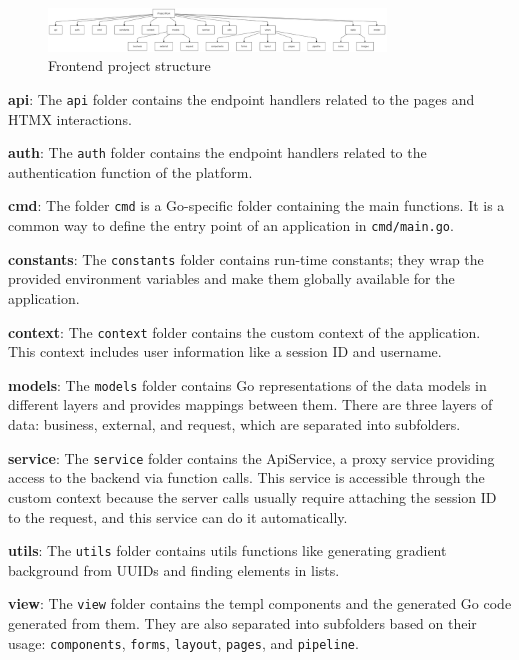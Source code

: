 \begin{figure}[H]
    \centering
    \includegraphics[width=0.8\textwidth, keepaspectratio]{figures/frontend-project-structure.png}
    \caption{Frontend project structure}
    \label{fig:frontend-project-structure}
\end{figure}

\textbf{api}: The \texttt{api} folder contains the endpoint handlers related to the pages and HTMX interactions.

\textbf{auth}: The \texttt{auth} folder contains the endpoint handlers related to the authentication function of the platform.

\textbf{cmd}: The folder \texttt{cmd} is a Go-specific folder containing the main functions. It is a common way to define the entry point of an application in \texttt{cmd/main.go}.

\textbf{constants}: The \texttt{constants} folder contains run-time constants; they wrap the provided environment variables and make them globally available for the application.

\textbf{context}: The \texttt{context} folder contains the custom context of the application. This context includes user information like a session ID and username.

\textbf{models}: The \texttt{models} folder contains Go representations of the data models in different layers and provides mappings between them. There are three layers of data: business, external, and request, which are separated into subfolders.

\textbf{service}: The \texttt{service} folder contains the ApiService, a proxy service providing access to the backend via function calls. This service is accessible through the custom context because the server calls usually require attaching the session ID to the request, and this service can do it automatically.

\textbf{utils}: The \texttt{utils} folder contains utils functions like generating gradient background from UUIDs and finding elements in lists.

\textbf{view}: The \texttt{view} folder contains the templ components and the generated Go code generated from them. They are also separated into subfolders based on their usage: \texttt{components}, \texttt{forms}, \texttt{layout}, \texttt{pages}, and \texttt{pipeline}.

